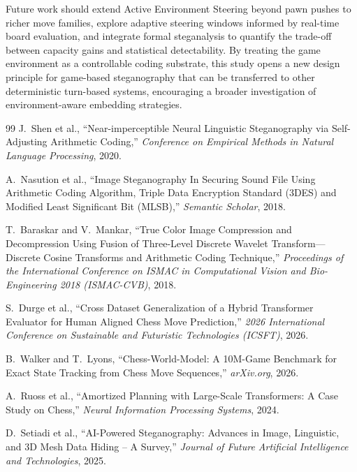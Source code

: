 \documentclass[journal]{IEEEtran}
\begin{document}
Future work should extend Active Environment Steering beyond pawn pushes to richer move families, explore adaptive steering windows informed by real-time board evaluation, and integrate formal steganalysis to quantify the trade-off between capacity gains and statistical detectability. By treating the game environment as a controllable coding substrate, this study opens a new design principle for game-based steganography that can be transferred to other deterministic turn-based systems, encouraging a broader investigation of environment-aware embedding strategies.

\clearpage
\onecolumn
\begin{thebibliography}{99}
 J.~Shen et al., ``Near-imperceptible Neural Linguistic Steganography via Self-Adjusting Arithmetic Coding,'' \textit{Conference on Empirical Methods in Natural Language Processing}, 2020.

 A.~Nasution et al., ``Image Steganography In Securing Sound File Using Arithmetic Coding Algorithm, Triple Data Encryption Standard (3DES) and Modified Least Significant Bit (MLSB),'' \textit{Semantic Scholar}, 2018.

 T.~Baraskar and V.~Mankar, ``True Color Image Compression and Decompression Using Fusion of Three-Level Discrete Wavelet Transform---Discrete Cosine Transforms and Arithmetic Coding Technique,'' \textit{Proceedings of the International Conference on ISMAC in Computational Vision and Bio-Engineering 2018 (ISMAC-CVB)}, 2018.

 S.~Durge et al., ``Cross Dataset Generalization of a Hybrid Transformer Evaluator for Human Aligned Chess Move Prediction,'' \textit{2026 International Conference on Sustainable and Futuristic Technologies (ICSFT)}, 2026.

 B.~Walker and T.~Lyons, ``Chess-World-Model: A 10M-Game Benchmark for Exact State Tracking from Chess Move Sequences,'' \textit{arXiv.org}, 2026.

 A.~Ruoss et al., ``Amortized Planning with Large-Scale Transformers: A Case Study on Chess,'' \textit{Neural Information Processing Systems}, 2024.

 D.~Setiadi et al., ``AI-Powered Steganography: Advances in Image, Linguistic, and 3D Mesh Data Hiding -- A Survey,'' \textit{Journal of Future Artificial Intelligence and Technologies}, 2025.


\end{thebibliography}
\end{document}
